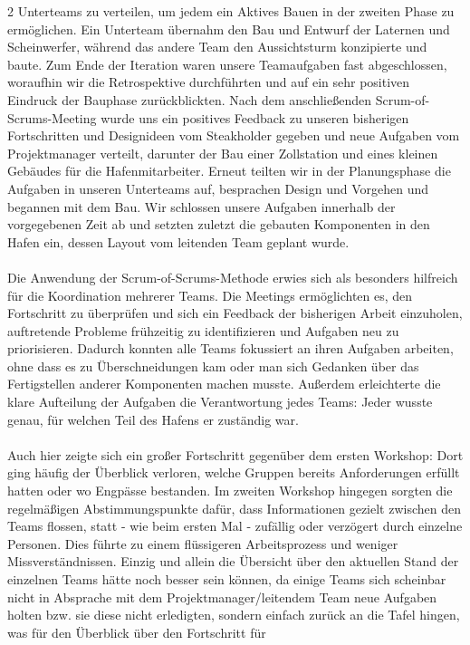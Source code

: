 \documentclass{article}
\begin{document}
2 Unterteams zu verteilen, um jedem ein Aktives Bauen in der zweiten Phase zu ermöglichen. Ein Unterteam übernahm den Bau und Entwurf der Laternen und Scheinwerfer, während
das andere Team den Aussichtsturm konzipierte und baute. Zum Ende der Iteration waren unsere Teamaufgaben fast abgeschlossen, woraufhin wir die Retrospektive durchführten und auf ein sehr positiven Eindruck der Bauphase zurückblickten.
Nach dem anschließenden Scrum-of-Scrums-Meeting wurde uns ein positives Feedback zu unseren bisherigen Fortschritten und Designideen vom Steakholder gegeben und neue Aufgaben vom Projektmanager verteilt, darunter
der Bau einer Zollstation und eines kleinen Gebäudes für die Hafenmitarbeiter.
Erneut teilten wir in der Planungsphase die Aufgaben in unseren Unterteams auf,
besprachen Design und Vorgehen und begannen mit dem Bau.
Wir schlossen unsere Aufgaben innerhalb der vorgegebenen Zeit ab und setzten zuletzt
die gebauten Komponenten in den Hafen ein, dessen Layout vom leitenden Team geplant wurde.
\\
\\
Die Anwendung der Scrum-of-Scrums-Methode erwies sich als besonders hilfreich für
die Koordination mehrerer Teams. Die Meetings ermöglichten
es, den Fortschritt zu überprüfen und sich ein Feedback der bisherigen Arbeit einzuholen, auftretende Probleme frühzeitig zu identifizieren
und Aufgaben neu zu priorisieren. Dadurch konnten alle Teams fokussiert an ihren
Aufgaben arbeiten, ohne dass es zu Überschneidungen kam oder man sich Gedanken
über das Fertigstellen anderer Komponenten machen musste. Außerdem erleichterte
die klare Aufteilung der Aufgaben die Verantwortung jedes Teams: Jeder wusste
genau, für welchen Teil des Hafens er zuständig war.
\\
\\
Auch hier zeigte sich ein großer Fortschritt gegenüber dem ersten Workshop:
Dort ging häufig der Überblick verloren, welche Gruppen bereits Anforderungen erfüllt hatten oder wo Engpässe bestanden. Im zweiten Workshop hingegen sorgten die regelmäßigen Abstimmungspunkte dafür, dass Informationen gezielt zwischen den Teams flossen, statt - wie beim ersten Mal - zufällig oder verzögert durch einzelne Personen. Dies führte zu einem flüssigeren Arbeitsprozess und weniger Missverständnissen. Einzig und allein die Übersicht über den aktuellen Stand der einzelnen Teams hätte noch besser sein können, da einige Teams sich 
scheinbar nicht in Absprache mit dem Projektmanager/leitendem Team neue Aufgaben holten bzw. sie diese nicht 
erledigten, sondern einfach zurück an die Tafel hingen, was für den Überblick über den Fortschritt für 
\end{document}
